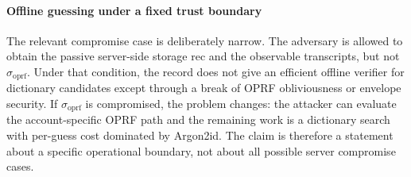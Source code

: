 \documentclass[preprint,12pt]{elsarticle}
\newcommand{\sigoprf}{\sigma_{\mathrm{oprf}}}
\theoremstyle{remark}
\begin{document}
\paragraph{Offline guessing under a fixed trust boundary}
The relevant compromise case is deliberately narrow. The adversary is
allowed to obtain the passive server-side storage $\mathrm{rec}$ and the
observable transcripts, but not $\sigoprf$. Under that condition, the
record does not give an efficient offline verifier for dictionary
candidates except through a break of OPRF obliviousness or envelope
security. If $\sigoprf$ is compromised, the problem changes: the attacker
can evaluate the account-specific OPRF path and the remaining work is a
dictionary search with per-guess cost dominated by Argon2id. The claim is
therefore a statement about a specific operational boundary, not about
all possible server compromise cases.
\end{document}
